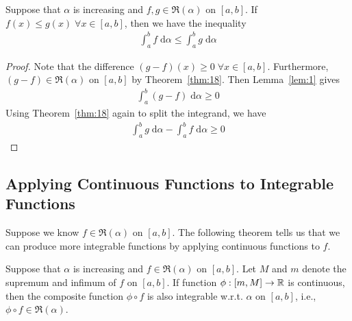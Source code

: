 \documentclass[thmcnt=section, 12pt]{my-elegantbook}
\begin{document}
\begin{theorem} \label{thm:30}
    Suppose that $\alpha$ is increasing and $f, g \in \mathfrak{R}(\alpha)$ on $[a, b]$. If $f(x) \leq g(x) \; \forall x \in [a, b]$, then we have the inequality
    \begin{align*}
        \int_{a}^{b} f \; \mathrm{d}\alpha 
        \leq \int_{a}^{b} g \; \mathrm{d}\alpha
    \end{align*}
\end{theorem}

\begin{proof}
    Note that the difference $(g-f)(x) \geq 0 \; \forall x \in [a, b]$. Furthermore, $(g-f) \in \mathfrak{R}(\alpha)$ on $[a, b]$ by Theorem~\ref{thm:18}. Then Lemma~\ref{lem:1} gives 
    \begin{align*}
        \int_{a}^{b} (g-f) \; \mathrm{d}\alpha \geq 0
    \end{align*}
    Using Theorem~\ref{thm:18} again to split the integrand, we have
    \begin{align*}
        \int_{a}^{b} g \; \mathrm{d}\alpha
        - \int_{a}^{b} f \; \mathrm{d}\alpha
        \geq 0
    \end{align*}
\end{proof}


\subsection{Applying Continuous Functions to Integrable Functions}

Suppose we know $f \in \mathfrak{R}(\alpha)$ on $[a, b]$. The following theorem tells us that we can produce more integrable functions by applying continuous functions to $f$.

\begin{theorem} \label{thm:29}
    Suppose that $\alpha$ is increasing and $f \in \mathfrak{R}(\alpha)$ on $[a, b]$. Let $M$ and $m$ denote the supremum and infimum of $f$ on $[a, b]$. If function $\phi: [m, M] \to \mathbb{R}$ is continuous, then the composite function $\phi \circ f$ is also integrable w.r.t. $\alpha$ on $[a, b]$, i.e., $\phi \circ f \in \mathfrak{R}(\alpha)$.
\end{theorem}
\end{document}
